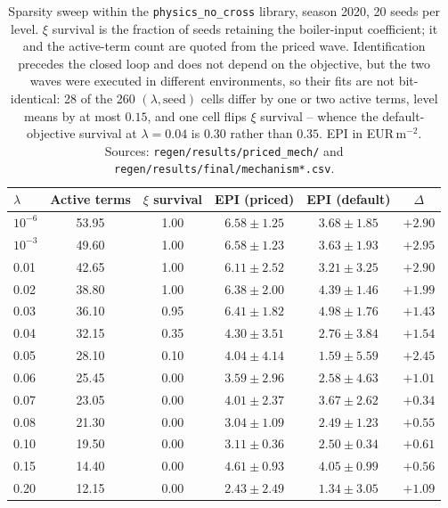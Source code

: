\begin{table}[t]
\centering
\caption{Sparsity sweep within the \texttt{physics\_no\_cross} library, season 2020,
20 seeds per level. $\xi$ survival is the fraction
of seeds retaining the boiler-input coefficient; it and the active-term count are quoted
from the priced wave. Identification precedes the closed loop and does not depend on the
objective, but the two waves were executed in different environments, so their fits are not
bit-identical: 28 of the 260 $(\lambda,\text{seed})$ cells differ by one or two active
terms, level means by at most $0.15$, and one cell flips $\xi$ survival -- whence the
default-objective survival at $\lambda=0.04$ is $0.30$ rather than $0.35$. EPI in
EUR\,m$^{-2}$. Sources: \texttt{regen/results/priced\_mech/} and
\texttt{regen/results/final/mechanism*.csv}.}
\label{tab:lambda}
\small
\begin{tabular}{@{}lccccc@{}}
\toprule
$\lambda$ & Active terms & $\xi$ survival & EPI (priced) & EPI (default) & $\Delta$ \\
\midrule
$10^{-6}$ & 53.95 & 1.00 & $6.58\pm1.25$ & $3.68\pm1.85$ & $+2.90$ \\
$10^{-3}$ & 49.60 & 1.00 & $6.58\pm1.23$ & $3.63\pm1.93$ & $+2.95$ \\
0.01 & 42.65 & 1.00 & $6.11\pm2.52$ & $3.21\pm3.25$ & $+2.90$ \\
0.02 & 38.80 & 1.00 & $6.38\pm2.00$ & $4.39\pm1.46$ & $+1.99$ \\
0.03 & 36.10 & 0.95 & $6.41\pm1.82$ & $4.98\pm1.76$ & $+1.43$ \\
0.04 & 32.15 & 0.35 & $4.30\pm3.51$ & $2.76\pm3.84$ & $+1.54$ \\
0.05 & 28.10 & 0.10 & $4.04\pm4.14$ & $1.59\pm5.59$ & $+2.45$ \\
0.06 & 25.45 & 0.00 & $3.59\pm2.96$ & $2.58\pm4.63$ & $+1.01$ \\
0.07 & 23.05 & 0.00 & $4.01\pm2.37$ & $3.67\pm2.62$ & $+0.34$ \\
0.08 & 21.30 & 0.00 & $3.04\pm1.09$ & $2.49\pm1.23$ & $+0.55$ \\
0.10 & 19.50 & 0.00 & $3.11\pm0.36$ & $2.50\pm0.34$ & $+0.61$ \\
0.15 & 14.40 & 0.00 & $4.61\pm0.93$ & $4.05\pm0.99$ & $+0.56$ \\
0.20 & 12.15 & 0.00 & $2.43\pm2.49$ & $1.34\pm3.05$ & $+1.09$ \\
\bottomrule
\end{tabular}
\end{table}

